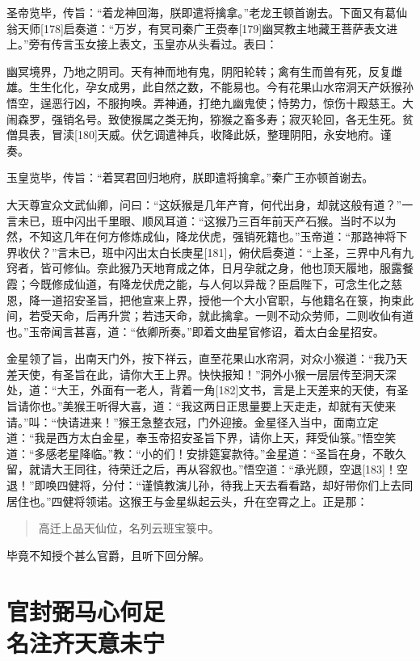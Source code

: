 \documentclass[12pt,UTF8]{ctexbook}
\begin{document}
圣帝览毕，传旨：“着龙神回海，朕即遣将擒拿。”老龙王顿首谢去。下面又有葛仙翁天师[178]启奏道：“万岁，有冥司秦广王赍奉[179]幽冥教主地藏王菩萨表文进上。”旁有传言玉女接上表文，玉皇亦从头看过。表曰：

幽冥境界，乃地之阴司。天有神而地有鬼，阴阳轮转；禽有生而兽有死，反复雌雄。生生化化，孕女成男，此自然之数，不能易也。今有花果山水帘洞天产妖猴孙悟空，逞恶行凶，不服拘唤。弄神通，打绝九幽鬼使；恃势力，惊伤十殿慈王。大闹森罗，强销名号。致使猴属之类无拘，猕猴之畜多寿；寂灭轮回，各无生死。贫僧具表，冒渎[180]天威。伏乞调遣神兵，收降此妖，整理阴阳，永安地府。谨奏。

玉皇览毕，传旨：“着冥君回归地府，朕即遣将擒拿。”秦广王亦顿首谢去。

大天尊宣众文武仙卿，问曰：“这妖猴是几年产育，何代出身，却就这般有道？”一言未已，班中闪出千里眼、顺风耳道：“这猴乃三百年前天产石猴。当时不以为然，不知这几年在何方修炼成仙，降龙伏虎，强销死籍也。”玉帝道：“那路神将下界收伏？”言未已，班中闪出太白长庚星[181]，俯伏启奏道：“上圣，三界中凡有九窍者，皆可修仙。奈此猴乃天地育成之体，日月孕就之身，他也顶天履地，服露餐霞；今既修成仙道，有降龙伏虎之能，与人何以异哉？臣启陛下，可念生化之慈恩，降一道招安圣旨，把他宣来上界，授他一个大小官职，与他籍名在箓，拘束此间，若受天命，后再升赏；若违天命，就此擒拿。一则不动众劳师，二则收仙有道也。”玉帝闻言甚喜，道：“依卿所奏。”即着文曲星官修诏，着太白金星招安。

金星领了旨，出南天门外，按下祥云，直至花果山水帘洞，对众小猴道：“我乃天差天使，有圣旨在此，请你大王上界。快快报知！”洞外小猴一层层传至洞天深处，道：“大王，外面有一老人，背着一角[182]文书，言是上天差来的天使，有圣旨请你也。”美猴王听得大喜，道：“我这两日正思量要上天走走，却就有天使来请。”叫：“快请进来！”猴王急整衣冠，门外迎接。金星径入当中，面南立定道：“我是西方太白金星，奉玉帝招安圣旨下界，请你上天，拜受仙箓。”悟空笑道：“多感老星降临。”教：“小的们！安排筵宴款待。”金星道：“圣旨在身，不敢久留，就请大王同往，待荣迁之后，再从容叙也。”悟空道：“承光顾，空退[183]！空退！”即唤四健将，分付：“谨慎教演儿孙，待我上天去看看路，却好带你们上去同居住也。”四健将领诺。这猴王与金星纵起云头，升在空霄之上。正是那：

\begin{quotation}
高迁上品天仙位，名列云班宝箓中。
\end{quotation}

毕竟不知授个甚么官爵，且听下回分解。

\chapter[官封弼马心何足\ 名注齐天意未宁]{官封弼马心何足\\名注齐天意未宁}
\end{document}
